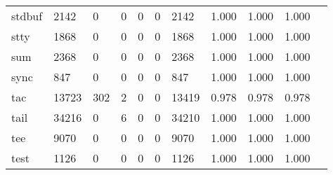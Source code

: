 \begin{longtable}{lp{1.10cm}p{1.10cm}p{1.10cm}p{1.10cm}p{1.10cm}p{1.10cm}p{1.10cm}p{1.10cm}p{1.10cm}p{1.10cm}}
stdbuf    &                   2142 &                                  0 &                                 0 &                                0 &                                 0 &                            2142 &                             1.000 &                                 1.000 &                               1.000 \\
stty      &                   1868 &                                  0 &                                 0 &                                0 &                                 0 &                            1868 &                             1.000 &                                 1.000 &                               1.000 \\
sum       &                   2368 &                                  0 &                                 0 &                                0 &                                 0 &                            2368 &                             1.000 &                                 1.000 &                               1.000 \\
sync      &                    847 &                                  0 &                                 0 &                                0 &                                 0 &                             847 &                             1.000 &                                 1.000 &                               1.000 \\
tac       &                  13723 &                                302 &                                 2 &                                0 &                                 0 &                           13419 &                             0.978 &                                 0.978 &                               0.978 \\
tail      &                  34216 &                                  0 &                                 6 &                                0 &                                 0 &                           34210 &                             1.000 &                                 1.000 &                               1.000 \\
tee       &                   9070 &                                  0 &                                 0 &                                0 &                                 0 &                            9070 &                             1.000 &                                 1.000 &                               1.000 \\
test      &                   1126 &                                  0 &                                 0 &                                0 &                                 0 &                            1126 &                             1.000 &                                 1.000 &                               1.000 \\

\end{longtable}
